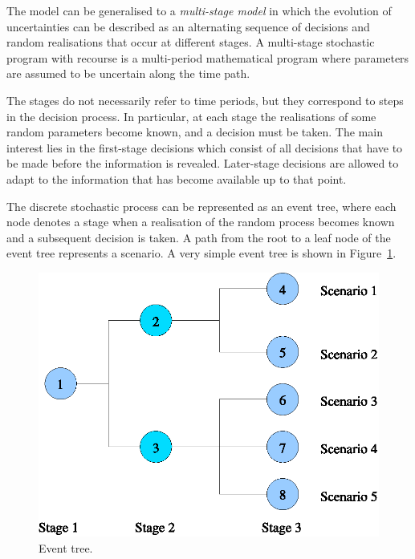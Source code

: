 
The model can be generalised to a {\em multi-stage model} in which 
the evolution of uncertainties can be 
described as an alternating sequence of decisions and random 
realisations that occur at different stages.
A multi-stage stochastic program with recourse is a multi-period 
mathematical program where parameters are assumed to be uncertain 
along the time path.

The stages do not necessarily refer to time periods, but they correspond
to steps in the decision process. In particular, at each stage the
realisations of some random parameters become known, and a decision
must be taken.
The main interest lies in the 
first-stage decisions which consist of all decisions that have to
be made before the information is revealed. Later-stage decisions 
are allowed to adapt to the information that has become available 
up to that point.

The discrete stochastic process can be represented as an event tree,
where each node denotes a stage when a realisation 
of the random process becomes known and a subsequent decision is taken.
A path from the root to a leaf node of the event tree represents a 
scenario.
A very simple event tree is shown in Figure~\ref{fig:EventTree}.
%
\begin{figure}[ht]
  \begin{center}
    \includegraphics[scale=0.6]{figures/tree.eps}
    \caption{Event tree.}
    \label{fig:EventTree}
  \end{center}
  \vspace{-3ex}
\end{figure}

